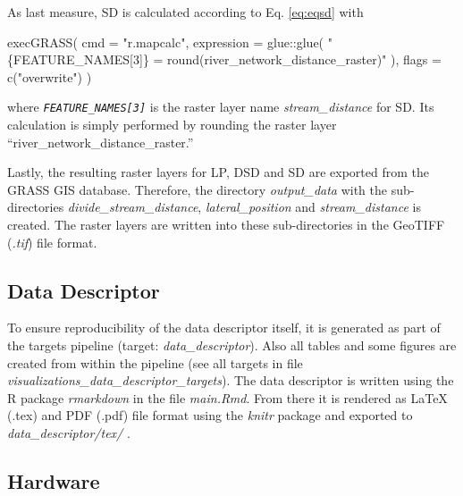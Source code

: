 \documentclass[fleqn,10pt]{wlscirep}
\newenvironment{Shaded}{\begin{snugshade}}{\end{snugshade}}
\newcommand{\AttributeTok}[1]{\textcolor[rgb]{0.77,0.63,0.00}{#1}}
\newcommand{\FunctionTok}[1]{\textcolor[rgb]{0.00,0.00,0.00}{#1}}
\newcommand{\NormalTok}[1]{#1}
\newcommand{\SpecialCharTok}[1]{\textcolor[rgb]{0.00,0.00,0.00}{#1}}
\newcommand{\StringTok}[1]{\textcolor[rgb]{0.31,0.60,0.02}{#1}}
\begin{document}
As last measure, SD is calculated according to Eq. \eqref{eq:eqsd} with

\small

\begin{Shaded}
\begin{Highlighting}[]
\FunctionTok{execGRASS}\NormalTok{(}
  \AttributeTok{cmd =} \StringTok{"r.mapcalc"}\NormalTok{,}
  \AttributeTok{expression =}\NormalTok{ glue}\SpecialCharTok{::}\FunctionTok{glue}\NormalTok{(}
    \StringTok{"\{FEATURE\_NAMES[3]\} = round(river\_network\_distance\_raster)"}
\NormalTok{  ),}
  \AttributeTok{flags =} \FunctionTok{c}\NormalTok{(}\StringTok{"overwrite"}\NormalTok{)}
\NormalTok{)}
\end{Highlighting}
\end{Shaded}

\normalsize
\noindent
where \emph{\texttt{FEATURE\_NAMES{[}3{]}}} is the raster layer name \emph{stream\_distance} for SD. Its calculation is simply performed by rounding the raster layer ``river\_network\_distance\_raster.''

Lastly, the resulting raster layers for LP, DSD and SD are exported from the GRASS GIS database. Therefore, the directory \emph{output\_data} with the sub-directories \emph{divide\_stream\_distance}, \emph{lateral\_position} and \emph{stream\_distance} is created. The raster layers are written into these sub-directories in the GeoTIFF (\emph{.tif}) file format.

\hypertarget{data-descriptor}{%
\subsection*{Data Descriptor}\label{data-descriptor}}

To ensure reproducibility of the data descriptor itself, it is generated as part of the targets pipeline (target: \emph{data\_descriptor}). Also all tables and some figures are created from within the pipeline (see all targets in file \emph{visualizations\_data\_descriptor\_targets}). The data descriptor is written using the R package \emph{rmarkdown} in the file \emph{main.Rmd}. From there it is rendered as LaTeX (.tex) and PDF (.pdf) file format using the \emph{knitr} package and exported to \emph{data\_descriptor/tex/} \cite{allaire_rmarkdown_2021, stodden_knitr_2014}.

\hypertarget{hardware}{%
\subsection*{Hardware}\label{hardware}}
\end{document}
